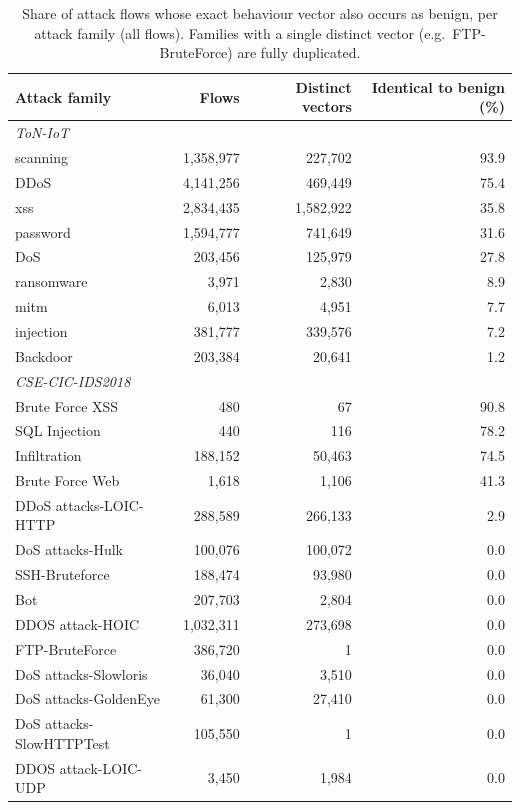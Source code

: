 \begin{table}[t]
\centering
\footnotesize
\caption{Share of attack flows whose exact behaviour vector also occurs as benign, per attack family (all flows). Families with a single distinct vector (e.g.\ FTP-BruteForce) are fully duplicated.}
\label{tab:families}
\begin{tabular}{lrrr}
\toprule
Attack family & Flows & Distinct vectors & Identical to benign (\%) \\
\midrule
\multicolumn{4}{l}{\textit{ToN-IoT}} \\
\quad scanning & 1,358,977 & 227,702 & 93.9 \\
\quad DDoS & 4,141,256 & 469,449 & 75.4 \\
\quad xss & 2,834,435 & 1,582,922 & 35.8 \\
\quad password & 1,594,777 & 741,649 & 31.6 \\
\quad DoS & 203,456 & 125,979 & 27.8 \\
\quad ransomware & 3,971 & 2,830 & 8.9 \\
\quad mitm & 6,013 & 4,951 & 7.7 \\
\quad injection & 381,777 & 339,576 & 7.2 \\
\quad Backdoor & 203,384 & 20,641 & 1.2 \\
\multicolumn{4}{l}{\textit{CSE-CIC-IDS2018}} \\
\quad Brute Force XSS & 480 & 67 & 90.8 \\
\quad SQL Injection & 440 & 116 & 78.2 \\
\quad Infiltration & 188,152 & 50,463 & 74.5 \\
\quad Brute Force Web & 1,618 & 1,106 & 41.3 \\
\quad DDoS attacks-LOIC-HTTP & 288,589 & 266,133 & 2.9 \\
\quad DoS attacks-Hulk & 100,076 & 100,072 & 0.0 \\
\quad SSH-Bruteforce & 188,474 & 93,980 & 0.0 \\
\quad Bot & 207,703 & 2,804 & 0.0 \\
\quad DDOS attack-HOIC & 1,032,311 & 273,698 & 0.0 \\
\quad FTP-BruteForce & 386,720 & 1 & 0.0 \\
\quad DoS attacks-Slowloris & 36,040 & 3,510 & 0.0 \\
\quad DoS attacks-GoldenEye & 61,300 & 27,410 & 0.0 \\
\quad DoS attacks-SlowHTTPTest & 105,550 & 1 & 0.0 \\
\quad DDOS attack-LOIC-UDP & 3,450 & 1,984 & 0.0 \\
\bottomrule
\end{tabular}
\end{table}
